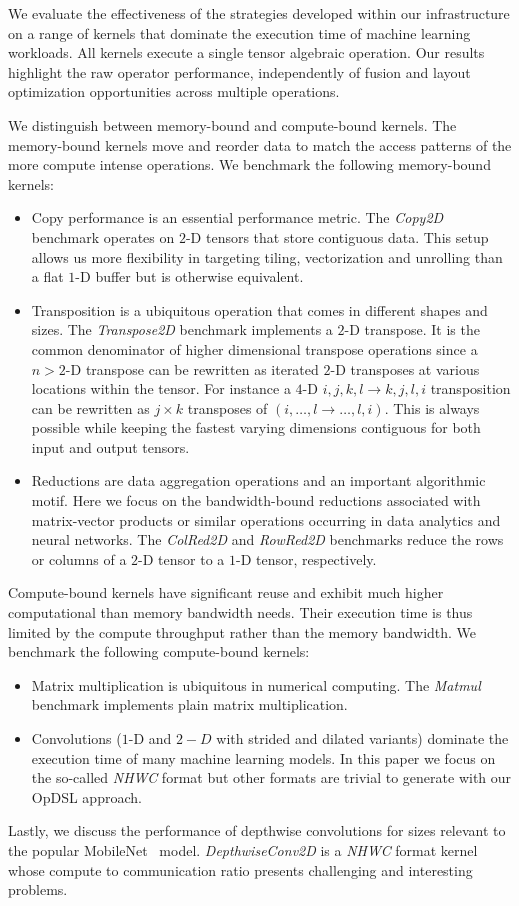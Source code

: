 We evaluate the effectiveness of the strategies developed within our infrastructure on a range of kernels that dominate the execution time of machine learning workloads. All kernels execute a single tensor algebraic operation. Our results highlight the raw operator performance, independently of fusion and layout optimization opportunities across multiple operations.

We distinguish between memory-bound and compute-bound kernels. The memory-bound kernels move and reorder data to match the access patterns of the more compute intense operations. We benchmark the following memory-bound kernels:
\begin{itemize}
    \item Copy performance is an essential performance metric. The \emph{Copy2D} benchmark operates on $2$-D tensors that store contiguous data. This setup allows us more flexibility in targeting tiling, vectorization and unrolling than a flat $1$-D buffer but is otherwise equivalent.
    \item Transposition is a ubiquitous operation that comes in different shapes and sizes. The \emph{Transpose2D} benchmark implements a $2$-D transpose. It is the common denominator of higher dimensional transpose operations since a $n>2$-D transpose can be rewritten as iterated $2$-D transposes at various locations within the tensor. For instance a $4$-D $i,j,k,l\xrightarrow{} k,j,l,i$ transposition can be rewritten as $j\times k$ transposes of $(i,\ldots,l\xrightarrow{}\ldots,l,i)$. 
    This is always possible while keeping the fastest varying dimensions contiguous for both input and output tensors. 
    \item Reductions are data aggregation operations and an important algorithmic motif. Here we focus on the bandwidth-bound reductions associated with matrix-vector products or similar operations occurring in data analytics and neural networks. 
    The \emph{ColRed2D} and \emph{RowRed2D} benchmarks reduce the rows or columns of a $2$-D tensor to a $1$-D tensor, respectively. 
\end{itemize}

Compute-bound kernels have significant reuse and exhibit much higher computational than memory bandwidth needs. 
Their execution time is thus limited by the compute throughput rather than the memory bandwidth.
We benchmark the following compute-bound kernels:
\begin{itemize}
\item Matrix multiplication is ubiquitous in numerical computing. 
  The \emph{Matmul} benchmark implements plain matrix multiplication.
\item Convolutions ($1$-D and $2-D$ with strided and dilated variants) dominate
  the execution time of many machine learning models. In this paper we focus on 
  the so-called \emph{NHWC} format but other formats are trivial to generate with
  our OpDSL approach.
\end{itemize}
Lastly, we discuss the performance of depthwise convolutions for sizes relevant to the popular MobileNet~\cite{MobileNetV2} model.
\emph{DepthwiseConv2D} is a \emph{NHWC} format kernel whose compute to communication ratio presents challenging and interesting problems. 

